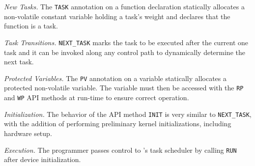 
\noindent\textit{New Tasks.} The \texttt{TASK} annotation on a function
declaration statically allocates a non-volatile constant variable holding a
task's weight and declares that the function is a task.

\noindent\textit{Task Transitions.} \texttt{NEXT\_TASK} marks the task to be executed after the current one task and it can be invoked along
any control path to dynamically determine the next task.

\noindent\textit{Protected Variables.} The \texttt{PV} annotation on a
variable statically allocates a protected non-volatile variable. The
variable must then be accessed with the \texttt{RP} and \texttt{WP} API methods at
run-time to ensure correct operation.

\noindent\textit{Initialization.} The behavior of the API method
\texttt{INIT} is very similar to \texttt{NEXT\_TASK}, with the
addition of performing preliminary kernel initializations, including hardware setup.

\noindent\textit{Execution.} The programmer passes control to \sys's task scheduler 
by calling \texttt{RUN} after device initialization. 

